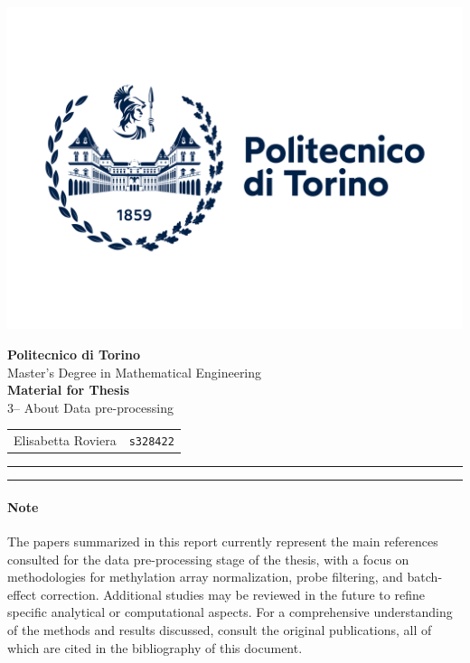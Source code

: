\documentclass[10pt]{extarticle}
\begin{document}
\noindent
\begin{minipage}{0.3\textwidth}
    \includegraphics[width=1.3\linewidth]{Figures/polito_logo_2021_blu.jpg}
\end{minipage}
\hfill
\begin{minipage}{0.68\textwidth}
    \raggedleft
    {\LARGE \textbf{Politecnico di Torino}}\\[0.2cm]
    {\large Master's Degree in Mathematical Engineering}\\[0.7cm]
    {\large \textbf{Material for Thesis}}\\[0.2cm]
    {\large 3-- About Data pre-processing}\\[0.7cm]
    \begin{tabular}{rl}
        Elisabetta Roviera & \texttt{s328422} \\
    \end{tabular}
\end{minipage}

\vspace{1cm}
\hrule
\vspace{0.5cm}

\tableofcontents

\vspace{0.5cm}
\hrule
\vspace{1cm}


\justifying

\paragraph{Note} 
The papers summarized in this report currently represent the main references consulted for the data pre-processing stage of the thesis, with a focus on methodologies for methylation array normalization, probe filtering, and batch-effect correction. Additional studies may be reviewed in the future to refine specific analytical or computational aspects. For a comprehensive understanding of the methods and results discussed, consult the original publications, all of which are cited in the bibliography of this document.
\end{document}
